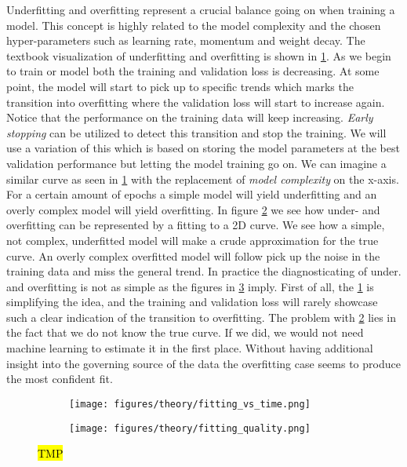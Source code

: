 Underfitting and overfitting represent a crucial balance going on when training
a model. This concept is highly related to the model complexity and the chosen
hyper-parameters such as learning rate, momentum and weight decay. The textbook
visualization of underfitting and overfitting is shown in
\cref{fig:fitting_vs_time}. As we begin to train or model both the training and
validation loss is decreasing. At some point, the model will start to pick up to
specific trends which marks the transition into overfitting where the validation
loss will start to increase again. Notice that the performance on the training
data will keep increasing.  \textit{Early stopping} can be utilized to detect
this transition and stop the training. We will use a variation of this which is
based on storing the model parameters at the best validation performance but
letting the model training go on. We can imagine a similar curve as seen in
\cref{fig:fitting_vs_time} with the replacement of \textit{model complexity} on
the x-axis. For a certain amount of epochs a simple model will yield
underfitting and an overly complex model will yield overfitting. In figure
\cref{fig:fitting_quality} we see how under- and overfitting can be represented
by a fitting to a 2D curve. We see how a simple, not complex, underfitted model
will make a crude approximation for the true curve. An overly complex
overfitted model will follow pick up the noise in the training data and miss the
general trend. In practice the diagnosticating of under. and overfitting is not
as simple as the figures in \cref{fig:over_under_fitting} imply. First of all,
the \cref{fig:fitting_vs_time} is simplifying the idea, and the training and
validation loss will rarely showcase such a clear indication of the transition
to overfitting. The problem with \cref{fig:fitting_quality} lies in the fact
that we do not know the true curve. If we did, we would not need machine
learning to estimate it in the first place. Without having additional insight into
the governing source of the data the overfitting case seems to produce the most
confident fit.


\begin{figure}[H]
  \centering
  \begin{subfigure}[t]{0.42\textwidth}
    \centering
    \texttt{[image: figures/theory/fitting\_vs\_time.png]}
    \caption{}
    \label{fig:fitting_vs_time}
  \end{subfigure}
  \hfill
  \begin{subfigure}[t]{0.57\textwidth}
    \centering
    \texttt{[image: figures/theory/fitting\_quality.png]}
    \caption{}
    \label{fig:fitting_quality}
  \end{subfigure}
  \hfill
  \caption{\hl{TMP}}
  \label{fig:over_under_fitting}
\end{figure}




